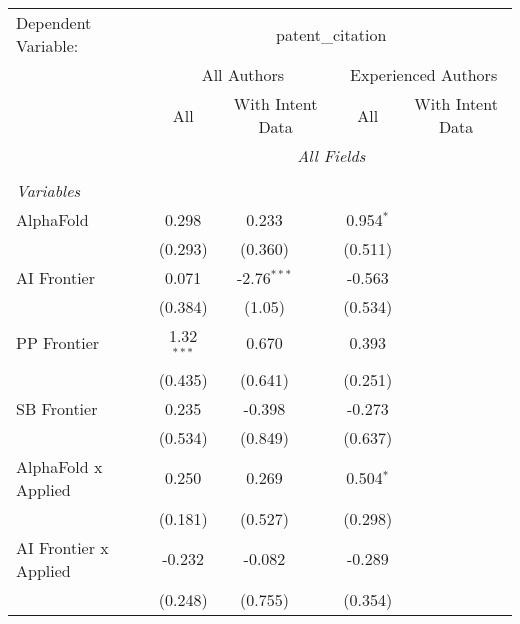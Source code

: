 \begingroup
\centering
\begin{tabular}{lcccccc}
   \tabularnewline \midrule \midrule
   Dependent Variable: & \multicolumn{6}{c}{patent\_citation}\\
 & \multicolumn{3}{c}{All Authors} & \multicolumn{3}{c}{Experienced Authors} \\
\cmidrule(lr){2-4} \cmidrule(lr){5-7}
 & \multicolumn{1}{c}{All} & \multicolumn{2}{c}{With Intent Data} & \multicolumn{1}{c}{All} & \multicolumn{2}{c}{With Intent Data} \\
\cmidrule(lr){2-2} \cmidrule(lr){3-4} \cmidrule(lr){5-5} \cmidrule(lr){6-7}
 & \multicolumn{6}{c}{\textit{All Fields}} \\ \\
   \emph{Variables}\\
   AlphaFold                      & 0.298         & 0.233         &               & 0.954$^{*}$   &        &   \\   
                                  & (0.293)       & (0.360)       &               & (0.511)       &        &   \\   
   AI Frontier                    & 0.071         & -2.76$^{***}$ &               & -0.563        &        &   \\   
                                  & (0.384)       & (1.05)        &               & (0.534)       &        &   \\   
   PP Frontier                    & 1.32$^{***}$  & 0.670         &               & 0.393         &        &   \\   
                                  & (0.435)       & (0.641)       &               & (0.251)       &        &   \\   
   SB Frontier                    & 0.235         & -0.398        &               & -0.273        &        &   \\   
                                  & (0.534)       & (0.849)       &               & (0.637)       &        &   \\   
   AlphaFold x Applied            & 0.250         & 0.269         &               & 0.504$^{*}$   &        &   \\   
                                  & (0.181)       & (0.527)       &               & (0.298)       &        &   \\   
   AI Frontier x Applied          & -0.232        & -0.082        &               & -0.289        &        &   \\   
                                  & (0.248)       & (0.755)       &               & (0.354)       &        &   \\   

\end{tabular}
